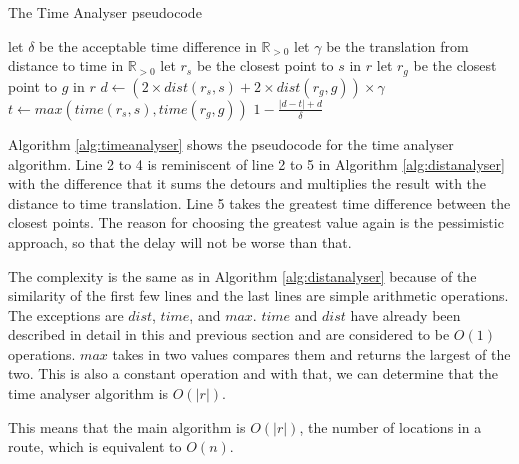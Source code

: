 \begin{algorithm}
	\caption{The Time Analyser pseudocode}
	\label{alg:timeanalyser}
	\begin{algorithmic}[1]
		\Require 
		\Statex let $\delta$ be the acceptable time difference in $\mathbb{R}_{>0}$
		\Statex let $\gamma$ be the translation from distance to time in $\mathbb{R}_{>0}$ 
		\Statex 
			\State let $r_s$ be the closest point to $s$ in $r$
			\State let $r_g$ be the closest point to $g$ in $r$
			\State $d \gets (2\times dist(r_s,s) + 2\times dist(r_g,g))\times\gamma$
			\State $t \gets max(time(r_s, s), time(r_g, g))$
			\State\Return $1-\frac{|d - t| + d}{\delta}$
		\EndFunction
	\end{algorithmic}
\end{algorithm}

Algorithm \ref{alg:timeanalyser} shows the pseudocode for the time analyser algorithm.
Line 2 to 4 is reminiscent of line 2 to 5 in Algorithm \ref{alg:distanalyser} with the difference that it sums the detours and multiplies the result with the distance to time translation.
Line 5 takes the greatest time difference between the closest points.
The reason for choosing the greatest value again is the pessimistic approach, so that the delay will not be worse than that.

The complexity is the same as in Algorithm \ref{alg:distanalyser} because of the similarity of the first few lines and the last lines are simple arithmetic operations. 
The exceptions are $dist$, $time$, and $max$. 
$time$ and $dist$ have already been described in detail in this and previous section and are considered to be $O(1)$ operations.
$max$ takes in two values compares them and returns the largest of the two.
This is also a constant operation and with that, we can determine that the time analyser algorithm is $O(|r|)$.

This means that the main algorithm is $O(|r|)$, the number of locations in a route, which is equivalent to $O(n)$.
